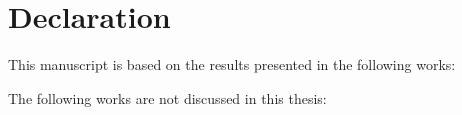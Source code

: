 \chapter*{Declaration}


This manuscript is based on the results presented in the following works:


\bigskip

\noindent The following works are not discussed in this thesis:


\cleardoublepage
